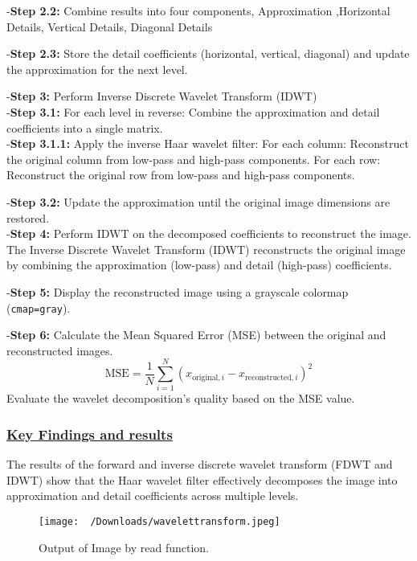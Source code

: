 \documentclass[
  11pt,
]{article}
\begin{document}
-\textbf{Step 2.2:} Combine results into four components, Approximation
,Horizontal Details, Vertical Details, Diagonal Details

-\textbf{Step 2.3:} Store the detail coefficients (horizontal, vertical,
diagonal) and update the approximation for the next level.

-\textbf{Step 3:} Perform Inverse Discrete Wavelet Transform (IDWT)\\
-\textbf{Step 3.1:} For each level in reverse: Combine the approximation
and detail coefficients into a single matrix.\\
-\textbf{Step 3.1.1:} Apply the inverse Haar wavelet filter: For each
column: Reconstruct the original column from low-pass and high-pass
components. For each row: Reconstruct the original row from low-pass and
high-pass components.

-\textbf{Step 3.2:} Update the approximation until the original image
dimensions are restored.\\
-\textbf{Step 4:} Perform IDWT on the decomposed coefficients to
reconstruct the image.\\
\hspace{2cm} The Inverse Discrete Wavelet Transform (IDWT) reconstructs
the original image by combining the approximation (low-pass) and detail
(high-pass) coefficients.

-\textbf{Step 5:} Display the reconstructed image using a grayscale
colormap (\texttt{cmap=\textquotesingle{}gray\textquotesingle{}}).

-\textbf{Step 6:} Calculate the Mean Squared Error (MSE) between the
original and reconstructed images.\\
\[
\text{MSE} = \frac{1}{N} \sum_{i=1}^{N} (x_{\text{original},i} - x_{\text{reconstructed},i})^2
\] Evaluate the wavelet decomposition's quality based on the MSE value.

\subsubsection*{\underline{Key Findings and results}}

The results of the forward and inverse discrete wavelet transform (FDWT
and IDWT) show that the Haar wavelet filter effectively decomposes the
image into approximation and detail coefficients across multiple levels.

\begin{figure}[H]
\centering
\texttt{[image: ~/Downloads/wavelettransform.jpeg]}
\caption{Output of Image by read function.}
\label{fig:flowchart}
\end{figure}
\end{document}
